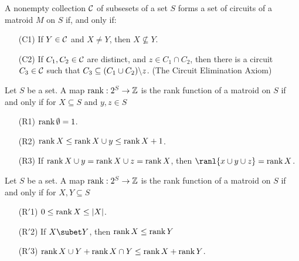 \begin{theorem}\label{1.1.2}
    A nonempty collection $\mathcal{C}$ of subsesets of a set $S$ forms a set of circuits of a matroid $M$ on
    $S$ if, and only if:
        \begin{enumerate}
            \item[(C1)] If $Y \in \mathcal{C}$ and  $X \neq Y$, then  $X \not\subseteq Y$.

            \item[(C2)] If $ C_1,C_2 \in \mathcal{C}$ are distinct, and $z \in C_1 \cap C_2$, then there is
                a circuit $ C_3 \in \mathcal{C}$ such that $ C_3 \subseteq (C_1\cup C_2)\backslash z$. (The
                Circuit Elimination Axiom)
        \end{enumerate}
\end{theorem}

\begin{theorem}\label{1.1.3}
    Let $S$ be a set. A map $\operatorname{rank}:2^S \rightarrow \mathbb{Z}$ is the rank function of a matroid on $S$ if
    and only if for $X \subseteq S$ and  $y,z \in S$
        \begin{enumerate}
            \item[(R1)] $\operatorname{rank}{\emptyset}=1$.

            \item[(R2)] $\operatorname{rank}{X} \leq \operatorname{rank}{X \cup y} \leq \operatorname{rank}{X}+1$.

            \item[(R3)] If $\operatorname{rank}{X \cup y}=\operatorname{rank}{X \cup z}=\operatorname{rank}{X}$, then $\ranl{x \cup y \cup
                z}=\rank{X}$.
        \end{enumerate}
\end{theorem}

\begin{theorem}\label{1.1.4}
    Let $S$ be a set. A map $\operatorname{rank}:2^S \rightarrow \mathbb{Z}$ is the rank function of a matroid on $S$ if
    and only if for $X,Y \subseteq S$
        \begin{enumerate}
            \item[(R$'$1)] $0 \leq \operatorname{rank}{X} \leq |X|$.

            \item[(R$'$2)] If $X \subet Y$, then  $\operatorname{rank}{X} \leq \operatorname{rank}{Y}$ 

            \item[(R$'$3)] $\operatorname{rank}{X \cup Y}+\operatorname{rank}{X \cap Y} \leq \operatorname{rank}{X}+\operatorname{rank}{Y}$.
        \end{enumerate}
\end{theorem}

